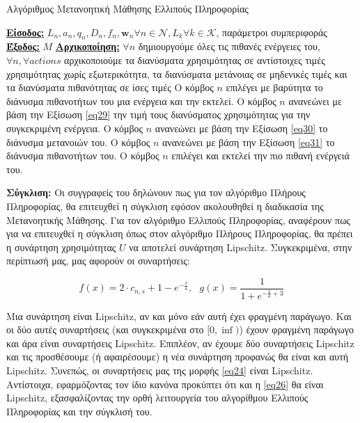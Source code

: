 \begin{algorithm}[h]
\caption{Αλγόριθμος Μετανοητική Μάθησης Ελλιπούς Πληροφορίας} \label{algorithm 6}
\begin{algorithmic}[1]
\STATE \textbf{\underline{Είσοδος:}} ${L_n, a_n, q_n, D_n, f_n, \mathbf{w}_n}{\forall n\in \mathcal{N}}, {L_k}{\forall k \in \mathcal{K}}$, παράμετροι συμπεριφοράς
\STATE \textbf{\underline{Έξοδος:}}  $M$
\STATE \textbf{\underline{Αρχικοποίηση:}} $\forall n$ δημιουργούμε όλες τις πιθανές ενέργειες του, $\forall n, \forall actions$ αρχικοποιούμε τα διανύσματα χρησιμότητας σε αντίστοιχες τιμές χρησιμότητας χωρίς εξωτερικότητα, τα διανύσματα μετάνοιας σε μηδενικές τιμές και τα διανύσματα πιθανότητας σε ίσες τιμές
\STATE Ο κόμβος $n$ επιλέγει με βαρύτητα το διάνυσμα πιθανοτήτων του μια ενέργεια και την εκτελεί.
\ENDFOR
{}
\STATE Ο κόμβος $n$ ανανεώνει με βάση την Εξίσωση \ref{eq29} την τιμή τους διανύσματος χρησιμότητας για την συγκεκριμένη ενέργεια.
\STATE Ο κόμβος $n$ ανανεώνει με βάση την Εξίσωση \ref{eq30} το διάνυσμα μετανοιών του.
\STATE Ο κόμβος $n$ ανανεώνει με βάση την Εξίσωση \ref{eq31} το διάνυσμα πιθανοτήτων του.
\ENDFOR
\ENDWHILE
{}
\STATE Ο κόμβος $n$ επιλέγει και εκτελεί την πιο πιθανή ενέργειά του.
\ENDFOR
\end{algorithmic}
\end{algorithm}
\vspace{-7pt}

\textbf{Σύγκλιση:} Οι συγγραφείς του  δηλώνουν πως για τον αλγόριθμο Πλήρους Πληροφορίας, θα επιτευχθεί η σύγκλιση εφόσον ακολουθηθεί η διαδικασία της Μετανοητικής Μάθησης. Για τον αλγόριθμο Ελλιπούς Πληροφορίας, αναφέρουν πως για να επιτευχθεί η σύγκλιση όπως στον αλγόριθμο Πλήρους Πληροφορίας, θα πρέπει η συνάρτηση χρησιμότητας $U$ να αποτελεί συνάρτηση Lipschitz. Συγκεκριμένα, στην περίπτωσή μας, μας αφορούν οι συναρτήσεις:

\[f(x) = 2 \cdot c_{n,s} + 1 - e^{-\frac{x}{a}}, \>\>\> g(x) = \frac{1}{1 + e^{-\frac{x}{a} + 3}}\]

Μια συνάρτηση είναι Lipschitz, αν και μόνο εάν αυτή έχει φραγμένη παράγωγο. Και οι δύο αυτές συναρτήσεις (και συγκεκριμένα στο $[0,\inf)$) έχουν φραγμένη παράγωγο και άρα είναι συναρτήσεις Lipschitz. Επιπλέον, αν έχουμε δύο συναρτήσεις Lipschitz και τις προσθέσουμε (ή αφαιρέσουμε) η νέα συνάρτηση προφανώς θα είναι και αυτή Lipschitz. Συνεπώς, οι συναρτήσεις μας της μορφής \ref{eq24} είναι Lipschitz. Αντίστοιχα, εφαρμόζοντας τον ίδιο κανόνα προκύπτει ότι και η \ref{eq26} θα είναι Lipschitz, εξασφαλίζοντας την ορθή λειτουργεία του αλγορίθμου Ελλιπούς Πληροφορίας και την σύγκλισή του.


